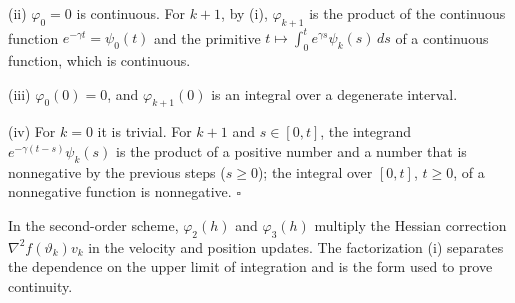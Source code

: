 \documentclass[11pt,a4paper]{article}
\begin{document}
(ii) \(\varphi_0=0\) is continuous. For \(k+1\), by (i), \(\varphi_{k+1}\) is the product of the continuous function \(e^{-\gamma t}=\psi_0(t)\) and the primitive \(t\mapsto\int_0^te^{\gamma s}\psi_k(s)\,ds\) of a continuous function, which is continuous.




(iii) \(\varphi_0(0)=0\), and \(\varphi_{k+1}(0)\) is an integral over a degenerate interval.




(iv) For \(k=0\) it is trivial. For \(k+1\) and \(s\in[0,t]\), the integrand \(e^{-\gamma(t-s)}\psi_k(s)\) is the product of a positive number and a number that is nonnegative by the previous steps (\(s\ge0\)); the integral over \([0,t]\), \(t\ge0\), of a nonnegative function is nonnegative. \(\square\)




In the second-order scheme, \(\varphi_2(h)\) and \(\varphi_3(h)\) multiply the Hessian correction \(\nabla^2f(\vartheta_k)v_k\) in the velocity and position updates. The factorization (i) separates the dependence on the upper limit of integration and is the form used to prove continuity.
\end{document}
